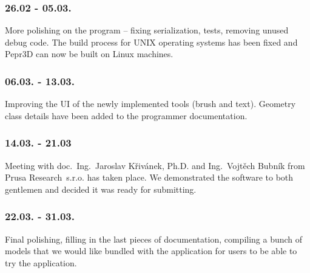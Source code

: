 \subsubsection{26.02 - 05.03.}

More polishing on the program -- fixing serialization, tests, removing unused debug code. The build process for UNIX operating systems has been fixed and Pepr3D can now be built on Linux machines.

\subsubsection{06.03. - 13.03.}

Improving the UI of the newly implemented tools (brush and text). Geometry class details have been added to the programmer documentation.

\subsubsection{14.03. - 21.03}

Meeting with doc.~Ing.~Jaroslav Křivánek, Ph.D. and Ing.~Vojtěch Bubník from Prusa Research~s.r.o. has taken place. We demonstrated the software to both gentlemen and decided it was ready for submitting.

\subsubsection{22.03. - 31.03.}

Final polishing, filling in the last pieces of documentation, compiling a bunch of models that we would like bundled with the application for users to be able to try the application.